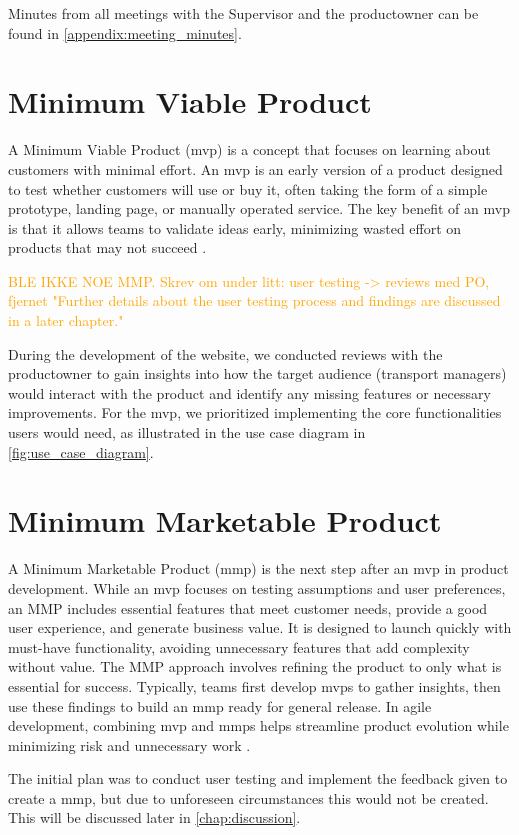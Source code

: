 Minutes from all meetings with the Supervisor and the \gls{productowner} can be found in \autoref{appendix:meeting_minutes}.

\section{Minimum Viable Product}

A Minimum Viable Product (\acrshort{mvp}) is a concept that focuses on learning about customers with minimal effort. An \acrshort{mvp} is an early version of a product designed to test whether customers will use or buy it, often taking the form of a simple prototype, landing page, or manually operated service. The key benefit of an \acrshort{mvp} is that it allows teams to validate ideas early, minimizing wasted effort on products that may not succeed \cite{agile_alliance_mvp}. 

\textcolor{orange}{BLE IKKE NOE MMP. Skrev om under litt: user testing -> reviews med PO, fjernet "Further details about the user testing process and findings are discussed in a later chapter."}

During the development of the website, we conducted reviews with the \gls{productowner} to gain insights into how the target audience (transport managers) would interact with the product and identify any missing features or necessary improvements. For the \acrshort{mvp}, we prioritized implementing the core functionalities users would need, as illustrated in the use case diagram in \autoref{fig:use_case_diagram}.

\section{Minimum Marketable Product}

A Minimum Marketable Product (\acrshort{mmp}) is the next step after an \Gls{mvp} in product development. While an \acrshort{mvp} focuses on testing assumptions and user preferences, an MMP includes essential features that meet customer needs, provide a good user experience, and generate business value. It is designed to launch quickly with must-have functionality, avoiding unnecessary features that add complexity without value. The MMP approach involves refining the product to only what is essential for success. Typically, teams first develop \acrshort{mvp}s to gather insights, then use these findings to build an \acrshort{mmp} ready for general release. In agile development, combining \acrshort{mvp} and \acrshort{mmp}s helps streamline product evolution while minimizing risk and unnecessary work \cite{wanner_mmp}. 

The initial plan was to conduct user testing and implement the feedback given to create a \acrshort{mmp}, but due to unforeseen circumstances this would not be created. This will be discussed later in \autoref{chap:discussion}.
